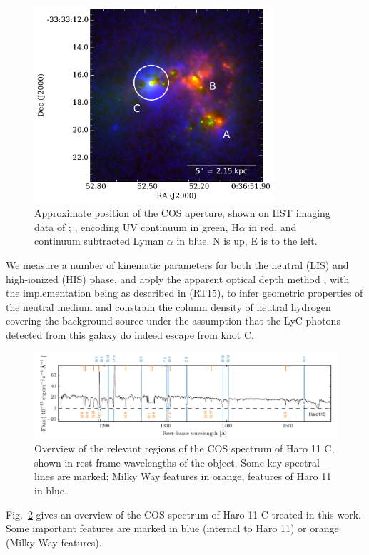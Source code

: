 \documentclass[twocolumn]{aastex61}
\begin{document}
\begin{figure}
\centering
\includegraphics[width=3.500in]{../Figs/Haroslit.pdf}
\caption{Approximate position of the COS aperture, shown on HST imaging
data of \citet{Hayes2009}; \citet{Ostlin2009}, encoding UV continuum in
green, H$\alpha$ in red, and continuum subtracted Lyman $\alpha$ in
blue. N is up, E is to the left.}\label{fig:apert}
\end{figure}

We measure a number of kinematic parameters for both the neutral (LIS)
and high-ionized (HIS) phase, and apply the apparent optical depth
method \citep{Savage1991, Pettini2002, Quider2009, Jones2013}, with the
implementation being as described in \citet{RiveraThorsen2015} (RT15),
to infer geometric properties of the neutral medium and constrain the
column density of neutral hydrogen covering the background source under
the assumption that the LyC photons detected from this galaxy do indeed
escape from knot C.

\begin{figure}
\centering
\includegraphics[]{../Figs/FullSpec.pdf}
\caption{Overview of the relevant regions of the COS spectrum of Haro 11
C, shown in rest frame wavelengths of the object. Some key spectral
lines are marked; Milky Way features in orange, features of Haro 11 in
blue.}\label{fig:fullspec}
\end{figure}

Fig.~\ref{fig:fullspec} gives an overview of the COS spectrum of Haro 11
C treated in this work. Some important features are marked in blue
(internal to Haro 11) or orange (Milky Way features).
\end{document}

